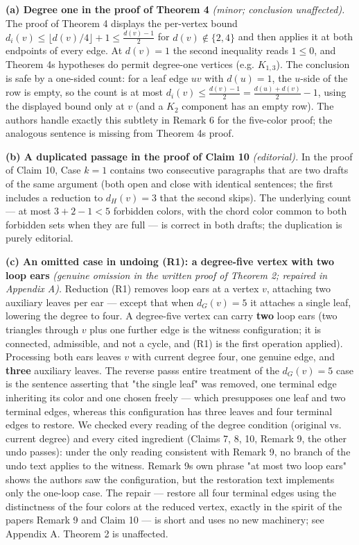 \documentclass[11pt]{article}
\theoremstyle{definition}
\theoremstyle{remark}
\begin{document}
\textbf{(a) Degree one in the proof of Theorem 4} \emph{(minor; conclusion unaffected).} The proof of Theorem 4 displays the per-vertex bound \(d_i(v) \le \lfloor d(v)/4 \rfloor + 1 \le \frac{d(v)-1}{2}\) for \(d(v) \notin \{2,4\}\) and then applies it at both endpoints of every edge. At \(d(v) = 1\) the second inequality reads \(1 \le 0\), and Theorem 4\textquotesingle s hypotheses do permit degree-one vertices (e.g. \(K_{1,3}\)). The conclusion is safe by a one-sided count: for a leaf edge \(uv\) with \(d(u) = 1\), the \(u\)-side of the row is empty, so the count is at most \(d_i(v) \le \frac{d(v)-1}{2} = \frac{d(u)+d(v)}{2} - 1\), using the displayed bound only at \(v\) (and a \(K_2\) component has an empty row). The authors handle exactly this subtlety in Remark 6 for the five-color proof; the analogous sentence is missing from Theorem 4\textquotesingle s proof.

\textbf{(b) A duplicated passage in the proof of Claim 10} \emph{(editorial).} In the proof of Claim 10, Case \(k=1\) contains two consecutive paragraphs that are two drafts of the same argument (both open and close with identical sentences; the first includes a reduction to \(d_H(v) = 3\) that the second skips). The underlying count --- at most \(3 + 2 - 1 < 5\) forbidden colors, with the chord color common to both forbidden sets when they are full --- is correct in both drafts; the duplication is purely editorial.

\textbf{(c) An omitted case in undoing (R1): a degree-five vertex with two loop ears} \emph{(genuine omission in the written proof of Theorem 2; repaired in Appendix A).} Reduction (R1) removes loop ears at a vertex \(v\), attaching two auxiliary leaves per ear --- except that when \(d_G(v) = 5\) it attaches a single leaf, lowering the degree to four. A degree-five vertex can carry \textbf{two} loop ears (two triangles through \(v\) plus one further edge is the witness configuration; it is connected, admissible, and not a cycle, and (R1) is the first operation applied). Processing both ears leaves \(v\) with current degree four, one genuine edge, and \textbf{three} auxiliary leaves. The reverse pass\textquotesingle s entire treatment of the \(d_G(v)=5\) case is the sentence asserting that "the single leaf" was removed, one terminal edge inheriting its color and one chosen freely --- which presupposes one leaf and two terminal edges, whereas this configuration has three leaves and four terminal edges to restore. We checked every reading of the degree condition (original vs. current degree) and every cited ingredient (Claims 7, 8, 10, Remark 9, the other undo passes): under the only reading consistent with Remark 9, no branch of the undo text applies to the witness. Remark 9\textquotesingle s own phrase "at most two loop ears" shows the authors saw the configuration, but the restoration text implements only the one-loop case. The repair --- restore all four terminal edges using the distinctness of the four colors at the reduced vertex, exactly in the spirit of the paper\textquotesingle s Remark 9 and Claim 10 --- is short and uses no new machinery; see Appendix A. Theorem 2 is unaffected.
\end{document}
